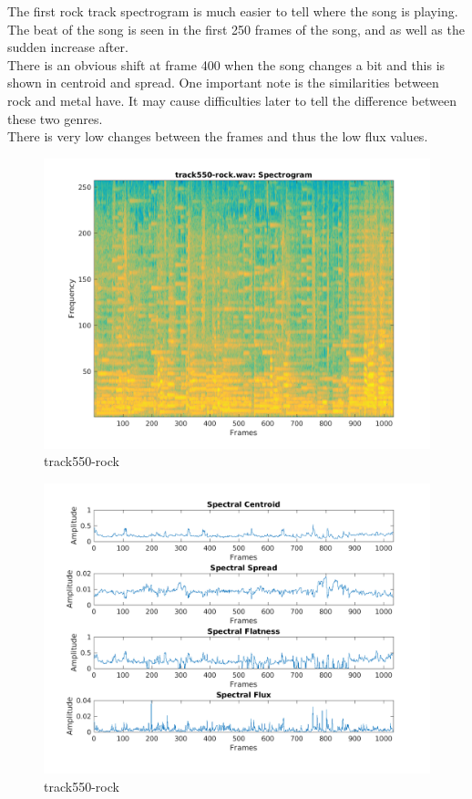 \documentclass[11pt, a4paper]{article}
\begin{document}
The first rock track spectrogram is much easier to tell where the song is playing. The beat of the song is seen in the first 250 frames of the song, and as well as the sudden increase after. \\

There is an obvious shift at frame 400 when the song changes a bit and this is shown in centroid and spread. One important note is the similarities between rock and metal have. It may cause difficulties later to tell the difference between these two genres. \\

There is very low changes between the frames and thus the low flux values. 

\pagebreak
\begin{figure}[H]
    \centering
    \includegraphics[width=.75\textwidth]{track550-rock-specto.png}
    \caption{track550-rock}
\end{figure}


\begin{figure}[H]
    \centering
    \includegraphics[width=\textwidth]{track550-rock-spectral.png}
    \caption{track550-rock}
\end{figure}
\pagebreak
\end{document}
